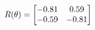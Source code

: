 \documentclass[preview]{standalone}
\begin{document}
\begin{align*}
\special{dvisvgm:raw <g id='unique000'>}R(\theta) = \begin{bmatrix}-0.81 & 0.59\\-0.59 & -0.81\end{bmatrix}\special{dvisvgm:raw </g>}
\end{align*}
\end{document}
